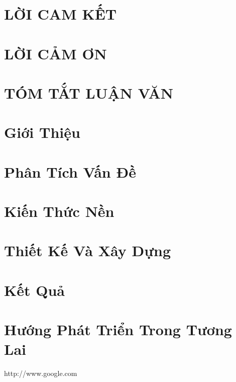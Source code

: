 \documentclass[14pt]{hcmutarticle}
\newcommand\blankpage{
    \null
    \thispagestyle{empty}
    \addtocounter{page}{-1}
    \newpage}
\begin{document}



\afterpage{\blankpage}

\setcounter{secnumdepth}{-2}

\newpage
\chapter{LỜI CAM KẾT}


\newpage
\chapter{LỜI CẢM ƠN}


\newpage
\chapter{TÓM TẮT LUẬN VĂN}


\newpage
\tableofcontents
\setcounter{secnumdepth}{5}

\newpage
\listoffigures

\newpage
\listoftables

\newpage
\printglossary[title=Danh mục các từ viết tắt,toctitle=Danh mục các từ viết tắt]


\newpage
\chapter{Giới Thiệu}


\chapter{Phân Tích Vấn Đề}


\chapter{Kiến Thức Nền}


\chapter{Thiết Kế Và Xây Dựng}


\chapter{Kết Quả}


\chapter{Hướng Phát Triển Trong Tương Lai}


\newpage
\begin{thebibliography}{}

http://www.google.com

\end{thebibliography}
\end{document}
